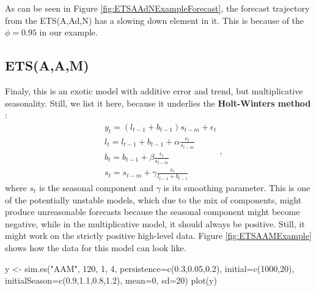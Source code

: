 \documentclass[
]{book}
\newenvironment{Shaded}{\begin{snugshade}}{\end{snugshade}}
\newcommand{\AttributeTok}[1]{\textcolor[rgb]{0.77,0.63,0.00}{#1}}
\newcommand{\DecValTok}[1]{\textcolor[rgb]{0.00,0.00,0.81}{#1}}
\newcommand{\FloatTok}[1]{\textcolor[rgb]{0.00,0.00,0.81}{#1}}
\newcommand{\FunctionTok}[1]{\textcolor[rgb]{0.00,0.00,0.00}{#1}}
\newcommand{\NormalTok}[1]{#1}
\newcommand{\OtherTok}[1]{\textcolor[rgb]{0.56,0.35,0.01}{#1}}
\newcommand{\StringTok}[1]{\textcolor[rgb]{0.31,0.60,0.02}{#1}}
\theoremstyle{definition}
\theoremstyle{definition}
\theoremstyle{definition}
\theoremstyle{definition}
\theoremstyle{remark}
\begin{document}
As can be seen in Figure \ref{fig:ETSAAdNExampleForecast}, the forecast trajectory from the ETS(A,Ad,N) has a slowing down element in it. This is because of the \(\phi=0.95\) in our example.

\hypertarget{ETSAAMModel}{%
\subsection{ETS(A,A,M)}\label{ETSAAMModel}}

Finaly, this is an exotic model with additive error and trend, but multiplicative seasonality. Still, we list it here, because it underlies the \textbf{Holt-Winters method} \citep{Winters1960}:
\begin{equation}
  \begin{aligned}
    & y_{t} = (l_{t-1} + b_{t-1}) s_{t-m} + \epsilon_t \\
    & l_t = l_{t-1} + b_{t-1} + \alpha \frac{\epsilon_t}{s_{t-m}} \\
    & b_t = b_{t-1} + \beta \frac{\epsilon_t}{s_{t-m}} \\
    & s_t = s_{t-m} + \gamma \frac{\epsilon_t}{l_{t-1}+b_{t-1}}
  \end{aligned} ,
  \label{eq:ETSAAM}
\end{equation}
where \(s_t\) is the seasonal component and \(\gamma\) is its smoothing parameter. This is one of the potentially unstable models, which due to the mix of components, might produce unreasonable forecasts because the seasonal component might become negative, while in the multiplicative model, it should always be positive. Still, it might work on the strictly positive high-level data. Figure \ref{fig:ETSAAMExample} shows how the data for this model can look like.

\begin{Shaded}
\begin{Highlighting}[]
\NormalTok{y }\OtherTok{\textless{}{-}} \FunctionTok{sim.es}\NormalTok{(}\StringTok{"AAM"}\NormalTok{, }\DecValTok{120}\NormalTok{, }\DecValTok{1}\NormalTok{, }\DecValTok{4}\NormalTok{, }\AttributeTok{persistence=}\FunctionTok{c}\NormalTok{(}\FloatTok{0.3}\NormalTok{,}\FloatTok{0.05}\NormalTok{,}\FloatTok{0.2}\NormalTok{),}
            \AttributeTok{initial=}\FunctionTok{c}\NormalTok{(}\DecValTok{1000}\NormalTok{,}\DecValTok{20}\NormalTok{), }\AttributeTok{initialSeason=}\FunctionTok{c}\NormalTok{(}\FloatTok{0.9}\NormalTok{,}\FloatTok{1.1}\NormalTok{,}\FloatTok{0.8}\NormalTok{,}\FloatTok{1.2}\NormalTok{),}
            \AttributeTok{mean=}\DecValTok{0}\NormalTok{, }\AttributeTok{sd=}\DecValTok{20}\NormalTok{)}
\FunctionTok{plot}\NormalTok{(y)}
\end{Highlighting}
\end{Shaded}
\end{document}
